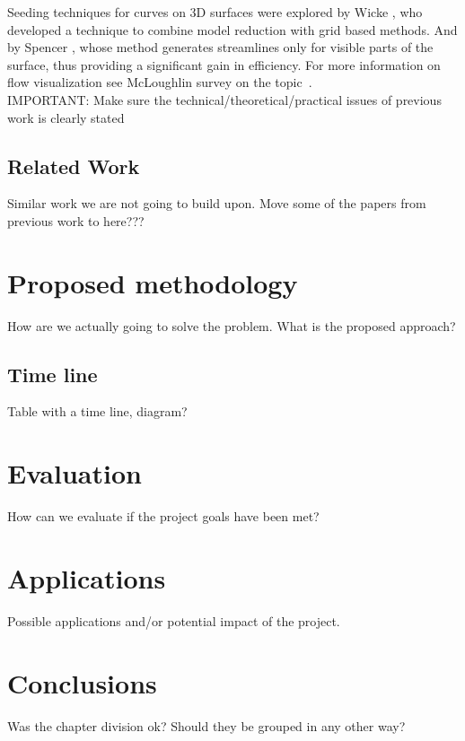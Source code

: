 \documentclass[11pt]{report}
\begin{document}
Seeding techniques for curves on 3D surfaces were explored by Wicke \cite{Wicke2009}, who developed a technique to combine model reduction with grid based methods.
And by Spencer \cite{Spencer2009}, whose method generates streamlines only for visible parts of the surface, thus providing a significant gain in efficiency.
For more information on flow visualization see McLoughlin survey on the topic~\cite{McLoughlin2010}.\\


IMPORTANT: Make sure the technical/theoretical/practical issues of previous work is clearly stated 
\section{Related Work}

Similar work we are not going to build upon.
Move some of the papers from previous work to here???

\chapter{Proposed methodology}

How are we actually going to solve the problem.
What is the proposed approach?

\section{Time line}

Table with a time line, diagram?

\chapter{Evaluation}

How can we evaluate if the project goals have been met?

\chapter{Applications}

Possible applications and/or potential impact of the project.


\chapter{Conclusions}

Was the chapter division ok?
Should they be grouped in any other way?




\end{document}
